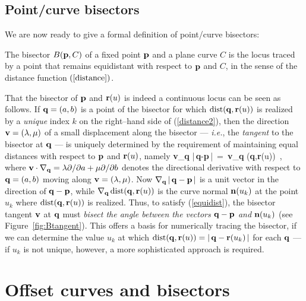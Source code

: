 \subsection{Point/curve bisectors}

We are now ready to give a formal definition of point/curve bisectors:

\begin{dfn} \label{defbsctr}
The bisector $B({\bf p},C)$ of a fixed point ${\bf p}$ and a plane
curve $C$ is the locus traced by a point that remains equidistant
with respect to ${\bf p}$ and $C$, in the sense of the distance
function $(\ref{distance})$.
\end{dfn}

That the bisector of ${\bf p}$ and ${\bf r}(u)$ is indeed a
continuous locus can be seen as follows. If ${\bf q}=(a,b)$ is a
point of the bisector for which ${\rm dist}({\bf q},{\bf r}(u))$ is
realized by a {\it unique\/} index $k$ on the right--hand side of
(\ref{distance2}), then the direction ${\bf v}=(\lambda,\mu)$ of
a small displacement along the bisector --- {\it i.e.}, the {\it
tangent\/} to the bisector at ${\bf q}$ --- is uniquely determined
by the requirement of maintaining equal distances with respect to
${\bf p}$ and ${\bf r}(u)$, namely
\be \label{equidist}
{\bf v}\cdot\!\nabla_{\bf q} \; |\,{\bf q}-{\bf p}\,| \,=\,
{\bf v}\cdot\!\nabla_{\bf q} \; \dist({\bf q},{\bf r}(u)) \,,
\ee
where ${\bf v}\cdot\nabla_{\bf q}=\lambda\partial/\partial a +
\mu\partial/\partial b$ denotes the directional derivative with
respect to ${\bf q}=(a,b)$ moving along ${\bf v}=(\lambda,\mu)$.
Now $\nabla_{\bf q}\,|\,{\bf q}-{\bf p}\,|$ is a unit vector
in the direction of ${\bf q}-{\bf p}$, while $\nabla_{\bf q}\,
{\rm dist}({\bf q},{\bf r}(u))$ is the curve normal ${\bf n}(u_k)$
at the point $u_k$ where ${\rm dist}({\bf q},{\bf r}(u))$ is realized.
Thus, to satisfy (\ref{equidist}), the bisector tangent ${\bf v}$
at ${\bf q}$ must {\it bisect the angle between
the vectors ${\bf q}-{\bf p}$ and ${\bf n}(u_k)$} (see
Figure~\ref{fig:Btangent}). This offers a basis for numerically
tracing the bisector, if we can determine the value $u_k$
at which ${\rm dist}({\bf q},{\bf r}(u))=|\,{\bf q}-{\bf r}(u_k)\,|$
for each ${\bf q}$ --- if $u_k$ is not unique, however, a more
sophisticated approach is required.



\section{Offset curves and bisectors}
\label{offsets}

